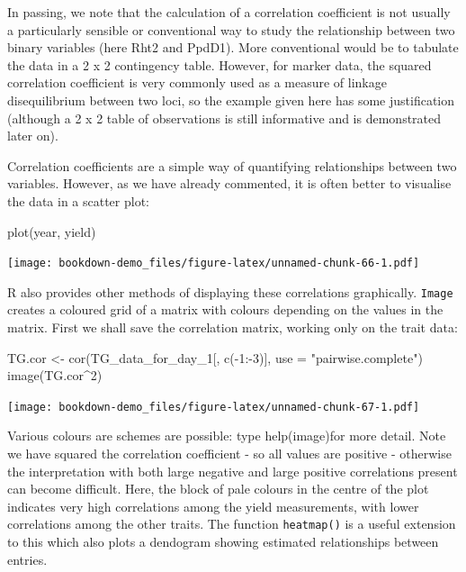 \documentclass[
]{book}
\newenvironment{Shaded}{\begin{snugshade}}{\end{snugshade}}
\newcommand{\AttributeTok}[1]{\textcolor[rgb]{0.77,0.63,0.00}{#1}}
\newcommand{\DecValTok}[1]{\textcolor[rgb]{0.00,0.00,0.81}{#1}}
\newcommand{\FunctionTok}[1]{\textcolor[rgb]{0.00,0.00,0.00}{#1}}
\newcommand{\NormalTok}[1]{#1}
\newcommand{\OtherTok}[1]{\textcolor[rgb]{0.56,0.35,0.01}{#1}}
\newcommand{\SpecialCharTok}[1]{\textcolor[rgb]{0.00,0.00,0.00}{#1}}
\newcommand{\StringTok}[1]{\textcolor[rgb]{0.31,0.60,0.02}{#1}}
\begin{document}
In passing, we note that the calculation of a correlation coefficient is not usually a particularly sensible or conventional way to study the relationship between two binary variables (here Rht2 and PpdD1). More conventional would be to tabulate the data in a 2 x 2 contingency table. However, for marker data, the squared correlation coefficient is very commonly used as a measure of linkage disequilibrium between two loci, so the example given here has some justification (although a 2 x 2 table of observations is still informative and is demonstrated later on).

Correlation coefficients are a simple way of quantifying relationships between two variables. However, as we have already commented, it is often better to visualise the data in a scatter plot:

\begin{Shaded}
\begin{Highlighting}[]
\FunctionTok{plot}\NormalTok{(year, yield)}
\end{Highlighting}
\end{Shaded}

\texttt{[image: bookdown-demo\_files/figure-latex/unnamed-chunk-66-1.pdf]}

R also provides other methods of displaying these correlations graphically. \texttt{Image} creates a coloured grid of a matrix with colours depending on the values in the matrix. First we shall save the correlation matrix, working only on the trait data:

\begin{Shaded}
\begin{Highlighting}[]
\NormalTok{TG.cor }\OtherTok{\textless{}{-}} \FunctionTok{cor}\NormalTok{(TG\_data\_for\_day\_1[, }\FunctionTok{c}\NormalTok{(}\SpecialCharTok{{-}}\DecValTok{1}\SpecialCharTok{:{-}}\DecValTok{3}\NormalTok{)], }\AttributeTok{use =} \StringTok{"pairwise.complete"}\NormalTok{)}
\FunctionTok{image}\NormalTok{(TG.cor}\SpecialCharTok{\^{}}\DecValTok{2}\NormalTok{)}
\end{Highlighting}
\end{Shaded}

\texttt{[image: bookdown-demo\_files/figure-latex/unnamed-chunk-67-1.pdf]}

Various colours are schemes are possible: type help(image)for more detail. Note we have squared the correlation coefficient - so all values are positive - otherwise the interpretation with both large negative and large positive correlations present can become difficult. Here, the block of pale colours in the centre of the plot indicates very high correlations among the yield measurements, with lower correlations among the other traits. The function \texttt{heatmap()} is a useful extension to this which also plots a dendogram showing estimated relationships between entries.
\end{document}
